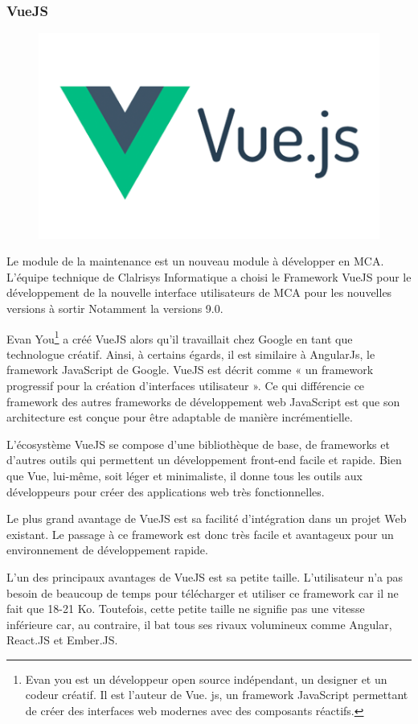 \subsubsection{VueJS}
\begin{figure}[hp]
    \centering
    \includegraphics{images/vuejs.png}
\end{figure}

Le module de la maintenance est un nouveau module à développer en MCA. L’équipe technique de 
Clalrisys Informatique a choisi le Framework VueJS pour le développement de la nouvelle 
interface utilisateurs de MCA pour les nouvelles versions à sortir Notamment la versions 9.0.

Evan You\footnote[13]{Evan you est un développeur open source indépendant, 
un designer et un codeur créatif. Il est l'auteur de Vue. js, un framework 
JavaScript permettant de créer des interfaces web modernes avec des composants réactifs.} 
a créé VueJS alors qu’il travaillait chez Google en tant que technologue créatif. 
Ainsi, à certains égards, il est similaire à AngularJs, le framework JavaScript de Google.
VueJS est décrit comme « un framework progressif pour la création d’interfaces utilisateur ». 
Ce qui différencie ce framework des autres frameworks de développement web JavaScript est que son 
architecture est conçue pour être adaptable de manière incrémentielle.

L’écosystème VueJS se compose d’une bibliothèque de base, de frameworks et d’autres outils qui 
permettent un développement front-end facile et rapide. Bien que Vue, lui-même, soit léger et 
minimaliste, il donne tous les outils aux développeurs pour créer des applications web très fonctionnelles.

Le plus grand avantage de VueJS est sa facilité d’intégration dans un projet Web existant. 
Le passage à ce framework est donc très facile et avantageux pour un environnement de développement rapide.

L’un des principaux avantages de VueJS est sa petite taille. L’utilisateur n’a pas
besoin de beaucoup de temps pour télécharger et utiliser ce framework car il ne fait que 
18-21 Ko. Toutefois, cette petite taille ne signifie pas une vitesse inférieure car, 
au contraire, il bat tous ses rivaux volumineux comme Angular, React.JS et Ember.JS.
\pagebreak
